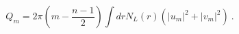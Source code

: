 \begin{equation}
Q_m = 2 \pi \left(m-\frac{n-1}{2}\right)\int dr N_L(r)
\left(|u_m|^2+ |v_m|^2 \right)~.
\end{equation}

